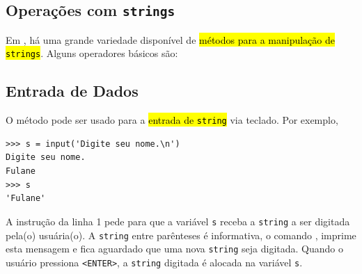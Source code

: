 \subsection{Operações com \texttt{strings}}

Em {\python}, há uma grande variedade disponível de \hl{métodos para a manipulação de \texttt{strings}}. Alguns operadores básicos são:

\subsection{Entrada de Dados}

O método {\PYTHONinput} pode ser usado para a \hl{entrada de \texttt{string}} via teclado. Por exemplo,

\begin{lstlisting}
>>> s = input('Digite seu nome.\n')
Digite seu nome.
Fulane
>>> s
'Fulane'
\end{lstlisting}

A instrução da linha 1 pede para que a variável \lstinline+s+ receba a \texttt{string} a ser digitada pela(o) usuária(o). A \texttt{string} entre parênteses é informativa, o comando {\PYTHONinput}, imprime esta mensagem e fica aguardado que uma nova \texttt{string} seja digitada. Quando o usuário pressiona \lstinline+<ENTER>+, a \texttt{string} digitada é alocada na variável \lstinline+s+.

